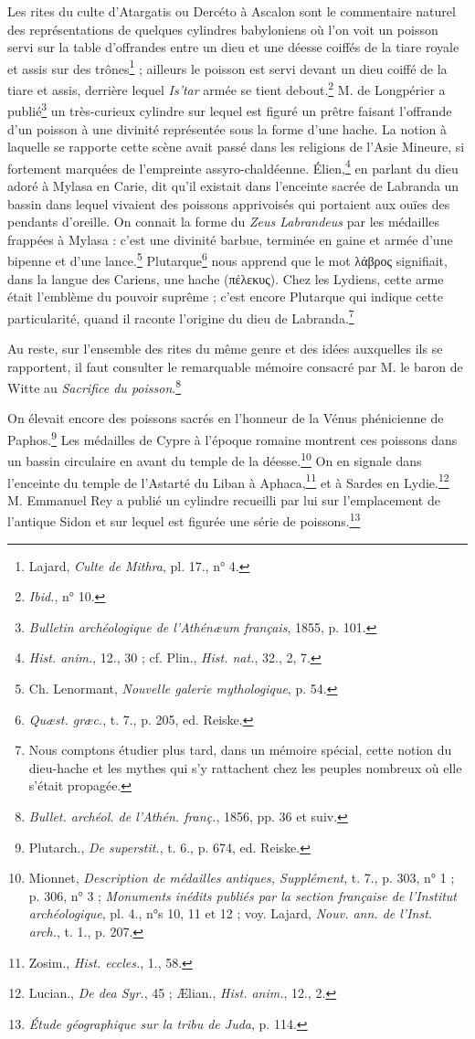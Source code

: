 \documentclass[a4paper, 11pt, oneside]{article}
\begin{document}
Les rites du culte d'Atargatis ou Dercéto à Ascalon sont le commentaire naturel des représentations de quelques cylindres babyloniens où l'on voit un poisson servi sur la table d'offrandes entre un dieu et une déesse coiffés de la tiare royale et assis sur des trônes\footnote{Lajard, \emph{Culte de Mithra}, pl. 17., n° 4.} ; ailleurs le poisson est servi devant un dieu coiffé de la tiare et assis, derrière lequel \emph{Is'tar} armée se tient debout.\footnote{\emph{Ibid.}, n° 10.} M. de Longpérier a publié\footnote{\emph{Bulletin archéologique de l'Athénæum français}, 1855, p. 101.} un très-curieux cylindre sur lequel est figuré un prêtre faisant l'offrande d'un poisson à une divinité représentée sous la forme d'une hache. La notion à laquelle se rapporte cette scène avait passé dans les religions de l'Asie Mineure, si fortement marquées de l'empreinte assyro-chaldéenne. Élien,\footnote{\emph{Hist. anim.}, 12., 30 ; cf. Plin., \emph{Hist. nat.}, 32., 2, 7.} en parlant du dieu adoré à Mylasa en Carie, dit qu'il existait dans l'enceinte sacrée de Labranda un bassin dans lequel vivaient des poissons apprivoisés qui portaient aux ouïes des pendants d'oreille. On connait la forme du \emph{Zeus Labrandeus} par les médailles frappées à Mylasa : c'est une divinité barbue, terminée en gaine et armée d'une bipenne et d'une lance.\footnote{Ch. Lenormant, \emph{Nouvelle galerie mythologique}, p. 54.} Plutarque\footnote{\emph{Quæst. græc.}, t. 7., p. 205, ed. Reiske.} nous apprend que le mot λάβρος signifiait, dans la langue des Cariens, une hache (πέλεκυς). Chez les Lydiens, cette arme était l'emblème du pouvoir suprême ; c'est encore Plutarque qui indique cette particularité, quand il raconte l'origine du dieu de Labranda.\footnote{Nous comptons étudier plus tard, dans un mémoire spécial, cette notion du dieu-hache et les mythes qui s'y rattachent chez les peuples nombreux où elle s'était propagée.}

Au reste, sur l'ensemble des rites du même genre et des idées auxquelles ils se rapportent, il faut consulter le remarquable mémoire consacré par M. le baron de Witte au \emph{Sacrifice du poisson}.\footnote{\emph{Bullet. archéol. de l'Athén. franç.}, 1856, pp. 36 et suiv.}

On élevait encore des poissons sacrés en l'honneur de la Vénus phénicienne de Paphos.\footnote{Plutarch., \emph{De superstit.}, t. 6., p. 674, ed. Reiske.} Les médailles de Cypre à l'époque romaine montrent ces poissons dans un bassin circulaire en avant du temple de la déesse.\footnote{Mionnet, \emph{Description de médailles antiques, Supplément}, t. 7., p. 303, n° 1 ; p. 306, n° 3 ; \emph{Monuments inédits publiés par la section française de l'Institut archéologique}, pl. 4., n°s 10, 11 et 12 ; voy. Lajard, \emph{Nouv. ann. de l'Inst. arch.}, t. 1., p. 207.} On en signale dans l'enceinte du temple de l'Astarté du Liban à Aphaca,\footnote{Zosim., \emph{Hist. eccles.}, 1., 58.} et à Sardes en Lydie.\footnote{Lucian., \emph{De dea Syr.}, 45 ; Ælian., \emph{Hist. anim.}, 12., 2.} M. Emmanuel Rey a publié un cylindre recueilli par lui sur l'emplacement de l'antique Sidon et sur lequel est figurée une série de poissons.\footnote{\emph{Étude géographique sur la tribu de Juda}, p. 114.}
\end{document}
